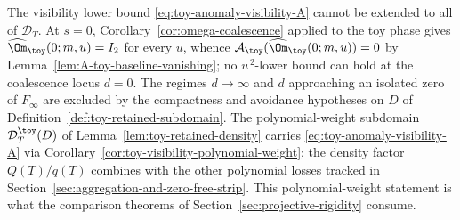 \begin{remark}
\label{rem:toy-anomaly-no-uniform-extension}
The visibility lower bound \eqref{eq:toy-anomaly-visibility-A} cannot
be extended to all of \(\mathcal D_T\).  At \(s=0\),
Corollary~\ref{cor:omega-coalescence} applied to the toy phase gives
\(\widehat\Om_\toy(0;m,u)=I_{2}\) for every \(u\), whence
\(\mathcal A_\toy(\widehat\Om_\toy(0;m,u))=0\) by
Lemma~\ref{lem:A-toy-baseline-vanishing}; no \(u^{\,2}\)-lower bound
can hold at the coalescence locus \(d=0\).  The regimes \(d\to\infty\)
and \(d\) approaching an isolated zero of \(F_{\infty}\) are excluded
by the compactness and avoidance hypotheses on \(D\) of
Definition~\ref{def:toy-retained-subdomain}.  The polynomial-weight
subdomain \(\mathcal D_T^\toy(D)\) of
Lemma~\ref{lem:toy-retained-density} carries
\eqref{eq:toy-anomaly-visibility-A} via
Corollary~\ref{cor:toy-visibility-polynomial-weight}; the density
factor \(Q(T)/q(T)\) combines with the other polynomial losses tracked
in Section~\ref{sec:aggregation-and-zero-free-strip}.  This
polynomial-weight statement is what the comparison theorems of
Section~\ref{sec:projective-rigidity} consume.
\end{remark}

